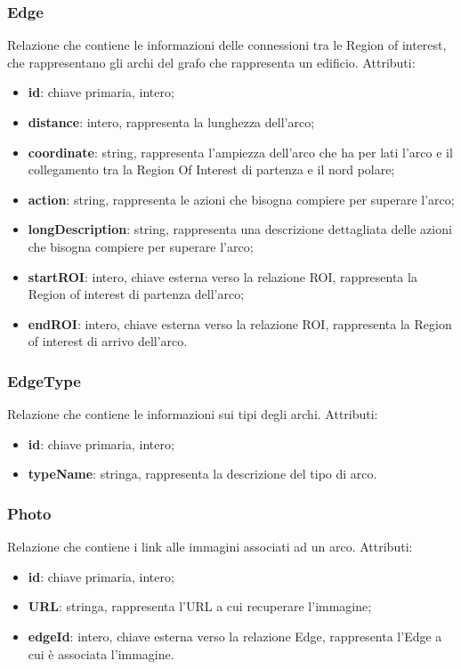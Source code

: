 \documentclass[../ManualeSviluppatore.tex]{subfiles}
\begin{document}
		\subsubsection{Edge}
		Relazione che contiene le informazioni delle connessioni tra le Region of interest, che rappresentano gli archi del grafo che rappresenta un edificio. Attributi:
			\begin{itemize}
			\item \textbf{id}: chiave primaria, intero;
			\item \textbf{distance}: intero, rappresenta la lunghezza dell'arco;
			\item \textbf{coordinate}: string, rappresenta l'ampiezza dell'arco che ha per lati l'arco e il collegamento tra la Region Of Interest di partenza e il nord polare; 
			\item \textbf{action}: string, rappresenta le azioni che bisogna compiere per superare l'arco;
			\item \textbf{longDescription}: string, rappresenta una descrizione dettagliata delle azioni che bisogna compiere per superare l'arco;
			\item \textbf{startROI}: intero, chiave esterna verso la relazione ROI, rappresenta la Region of interest di partenza dell'arco;
			\item \textbf{endROI}: intero, chiave esterna verso la relazione ROI, rappresenta la Region of interest di arrivo dell'arco.
			\end{itemize}
		\subsubsection{EdgeType}
		Relazione che contiene le informazioni sui tipi degli archi. Attributi:
			\begin{itemize}
			\item \textbf{id}: chiave primaria, intero;
			\item \textbf{typeName}: stringa, rappresenta la descrizione del tipo di arco.
			\end{itemize}
		\subsubsection{Photo}
		Relazione che contiene i link alle immagini associati ad un arco. Attributi:
			\begin{itemize}
			\item \textbf{id}: chiave primaria, intero;
			\item \textbf{URL}: stringa, rappresenta l'URL a cui recuperare l'immagine;
			\item \textbf{edgeId}: intero, chiave esterna verso la relazione Edge, rappresenta l'Edge a cui è associata l'immagine.
			\end{itemize}
\end{document}
